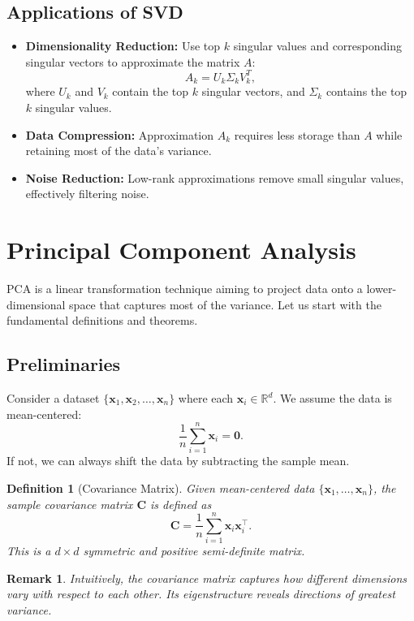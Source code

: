 \documentclass[12pt,a4paper]{article}
\newtheorem{definition}{Definition}
\newtheorem{remark}{Remark}
\begin{document}
\subsection{Applications of SVD}
\begin{itemize}
    \item \textbf{Dimensionality Reduction:} Use top $k$ singular values and corresponding singular vectors to approximate the matrix $A$:
    \begin{equation}
    A_k = U_k \Sigma_k V_k^T,
    \end{equation}
    where $U_k$ and $V_k$ contain the top $k$ singular vectors, and $\Sigma_k$ contains the top $k$ singular values.
    \item \textbf{Data Compression:} Approximation $A_k$ requires less storage than $A$ while retaining most of the data's variance.
    \item \textbf{Noise Reduction:} Low-rank approximations remove small singular values, effectively filtering noise.
\end{itemize}

\section{Principal Component Analysis}\label{sec:PCA}
PCA is a linear transformation technique aiming to project data onto a lower-dimensional space that captures most of the variance. Let us start with the fundamental definitions and theorems.

\subsection{Preliminaries}
Consider a dataset $\{\mathbf{x}_1, \mathbf{x}_2, \ldots, \mathbf{x}_n\}$ where each $\mathbf{x}_i \in \mathbb{R}^d$. We assume the data is mean-centered:
\[
\frac{1}{n}\sum_{i=1}^n \mathbf{x}_i = \mathbf{0}.
\]
If not, we can always shift the data by subtracting the sample mean.

\begin{definition}[Covariance Matrix]
Given mean-centered data $\{\mathbf{x}_1,\ldots,\mathbf{x}_n\}$, the sample covariance matrix $\mathbf{C}$ is defined as
\[
\mathbf{C} = \frac{1}{n}\sum_{i=1}^n \mathbf{x}_i \mathbf{x}_i^\top.
\]
This is a $d \times d$ symmetric and positive semi-definite matrix.
\end{definition}

\begin{remark}
Intuitively, the covariance matrix captures how different dimensions vary with respect to each other. Its eigenstructure reveals directions of greatest variance.
\end{remark}
\end{document}
